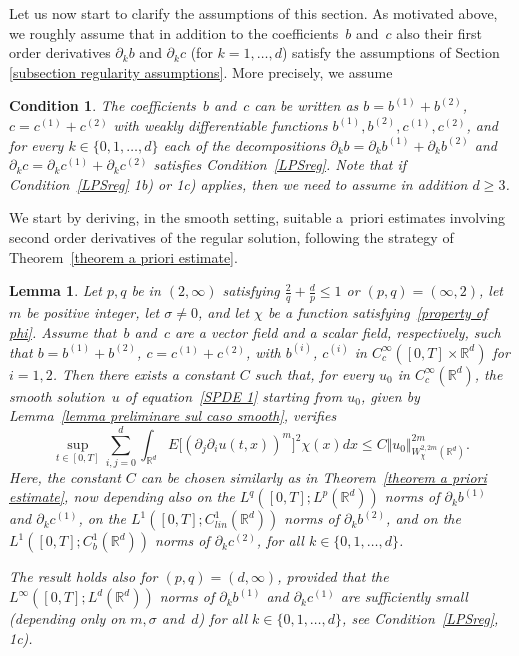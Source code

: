 \documentclass[a4paper,10pt]{article}
\newtheorem{condition}[theorem]{Condition}
\newtheorem{lemma}[theorem]{Lemma}
\newcommand\1{\mathbbm{1}}
\numberwithin{equation}{section}
\begin{document}
Let us now start to clarify the assumptions of this section. As motivated above, we roughly assume that in addition to the coefficients~$b$ and~$c$ also their first order derivatives $\partial_{k}b$ and $\partial_{k}c$ (for $k=1,\ldots,d$) satisfy the assumptions of Section
\ref{subsection regularity assumptions}. More precisely, we assume

\begin{condition}
\label{LPSreg second order}
The coefficients~$b$ and~$c$ can be written as $b = b^{(1)} + b^{(2)}$, $c = c^{(1)} + c^{(2)}$ with weakly differentiable functions $b^{(1)}, b^{(2)}, c^{(1)}, c^{(2)}$, and  
for every $k \in \{0,1,\ldots,d\}$ each of the decompositions $\partial_k b = \partial_k b^{(1)} + \partial_k b^{(2)}$ and $\partial_k c = \partial_k c^{(1)} + \partial_k c^{(2)}$ satisfies Condition~\ref{LPSreg}. Note that if Condition~\ref{LPSreg} \textup{1b)} or \textup{1c)} applies, then we need to assume in addition $d \geq 3$.
\end{condition}

We start by deriving, in the smooth setting, suitable a~priori estimates involving second order derivatives of the regular solution, following the strategy of Theorem~\ref{theorem a priori estimate}.

\begin{lemma}
Let $p,q$ be in $(2,\infty)$ satisfying $\frac{2}{q}+\frac{d}{p}\leq1$ or $(p,q)=(\infty,2)$,
let $m$ be positive integer, let $\sigma \neq 0$, and let $\chi$ be a function 
satisfying~\eqref{property of phi}. Assume that~$b$ and~$c$ are a vector field and a scalar field, respectively, such that $b=b^{(1)}+b^{(2)}$, $c=c^{(1)}+c^{(2)}$, with $b^{(i)}$, $c^{(i)}$ in $C_{c}^{\infty}([0,T]\times \mathbb{R}^{d})$ for $i=1,2$. Then there exists a constant $C$ such that, for every $u_{0}$ in $C_{c}^{\infty}(\mathbb{R}^{d})$, the smooth solution~$u$ of equation~\eqref{SPDE 1} starting from $u_{0}$, given by Lemma~\ref{lemma preliminare sul caso smooth}, verifies
\[
\sup_{t\in [0,T]}\sum_{i,j=0}^{d} \int_{\mathbb{R}^{d}} E\big[ (\partial_j \partial_{i}u(t,x))^{m} \big]^{2} \chi(x) dx\leq C \Vert u_{0} \Vert_{W_{\chi}^{2,2m}(\mathbb{R}^{d}) }^{2m}.
\]
Here, the constant $C$ can be chosen similarly as in Theorem~\ref{theorem a priori estimate}, now depending also on the $L^{q}([0,T];L^{p}(\mathbb{R}^{d}))$ norms of $\partial_k b^{(1)}$ and $\partial_k c^{(1)}$, on the $L^{1}([0,T];C_{lin}^{1}(\mathbb{R}^{d}))$ norms of
$\partial_k b^{(2)}$, and on the $L^{1}([0,T];C_{b}^{1}(\mathbb{R}^{d}))$ norms of $\partial_k c^{(2)}$, for all $k \in \{0,1,\ldots,d\}$.

The result holds also for $(p,q)=(d,\infty)$, provided that the $L^{\infty}([0,T];L^{d}(\mathbb{R}^{d}))$ norms of $\partial_k b^{(1)}$ and $\partial_k c^{(1)}$ are sufficiently small \textup{(}depending only on $m,\sigma$ and~$d$\textup{)} for all $k \in \{0,1,\ldots,d\}$, see Condition~\ref{LPSreg}, \textup{1c)}.
\end{lemma}
\end{document}
